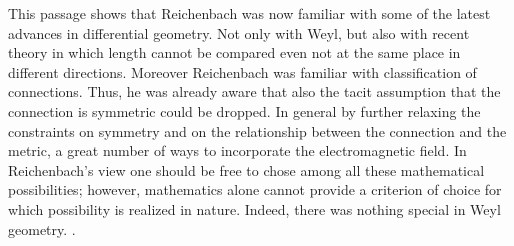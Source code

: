 \documentclass[draft]{article}
\begin{document}
%
This passage shows that Reichenbach was now familiar with some of the latest advances in differential geometry. Not only with Weyl, but also with  recent theory in which length cannot be compared even not at the same place in different directions. Moreover Reichenbach was familiar with  classification of connections. Thus, he was already aware that also the tacit assumption that the connection is symmetric could be dropped. In general by further relaxing the constraints on symmetry and on the relationship between the connection and the metric, a great number of ways to incorporate the electromagnetic field. In Reichenbach's view one should be free to chose among all these mathematical possibilities; however, mathematics alone cannot provide a criterion of choice for which possibility is realized in nature. Indeed, there was nothing special in Weyl geometry. .

\end{document}
